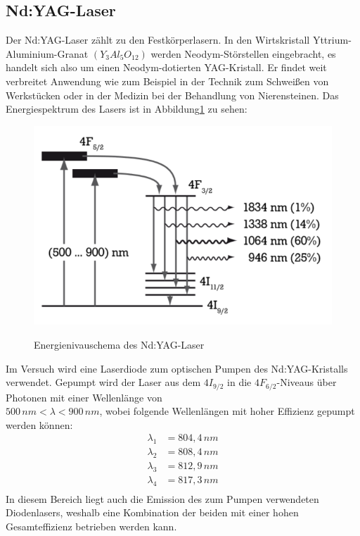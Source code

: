 \documentclass[twoside,colorback,accentcolor=tud4c,11pt]{tudreport}
\begin{document}
\subsection{Nd:YAG-Laser}
Der Nd:YAG-Laser zählt zu den Festkörperlasern. In den Wirtskristall Yttrium-Aluminium-Granat $(Y_{3}Al_{5}O_{12})$ werden Neodym-Störstellen eingebracht, es handelt sich also um einen Neodym-dotierten YAG-Kristall. Er findet weit verbreitet Anwendung wie zum Beispiel in der Technik zum Schweißen von Werkstücken oder in der Medizin bei der Behandlung von Nierensteinen. Das Energiespektrum des Lasers ist in Abbildung\ref{ndschem} zu sehen:
\begin{figure}[H]
\centering
   	\begin{minipage}[b]{0.6\textwidth}
   	\includegraphics[width=\textwidth]{graphics/ndyagschem.PNG}
  	\label{ndschem}
   	\end{minipage}
\caption{Energienivauschema des Nd:YAG-Laser \cite{2}} 	
\end{figure}
Im Versuch wird eine Laserdiode zum optischen Pumpen des Nd:YAG-Kristalls verwendet. Gepumpt wird der Laser aus dem $4I_{9/2}$ in die $4F_{6/2}$-Niveaus über Photonen mit einer Wellenlänge von \\ $500\,\si{nm}<\lambda<900\,\si{nm}$, wobei folgende Wellenlängen mit hoher Effizienz gepumpt werden können:
\begin{align}
\lambda_{1}&=804,4\,\si{nm}\\
\lambda_{2}&=808,4\,\si{nm}\\
\lambda_{3}&=812,9\,\si{nm}\\
\lambda_{4}&=817,3\,\si{nm}\\
\end{align}
In diesem Bereich liegt auch die Emission des zum Pumpen verwendeten Diodenlasers, weshalb eine Kombination der beiden mit einer hohen Gesamteffizienz betrieben werden kann.\\
\end{document}
